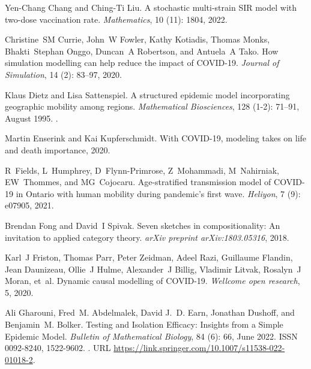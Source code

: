 \documentclass{article}
\theoremstyle{definition}
\begin{document}
\begin{thebibliography}{37}
Yen-Chang Chang and Ching-Ti Liu.
\newblock A stochastic multi-strain {SIR} model with two-dose vaccination rate.
\newblock \emph{Mathematics}, 10 (11): 1804, 2022.

Christine~SM Currie, John~W Fowler, Kathy Kotiadis, Thomas Monks,
  Bhakti~Stephan Onggo, Duncan~A Robertson, and Antuela~A Tako.
\newblock How simulation modelling can help reduce the impact of {COVID-19}.
\newblock \emph{Journal of Simulation}, 14 (2): 83--97, 2020.

Klaus Dietz and Lisa Sattenspiel.
\newblock A structured epidemic model incorporating geographic mobility among
  regions.
\newblock \emph{Mathematical Biosciences}, 128 (1-2): 71--91,
  August 1995.
\newblock {}.

Martin Enserink and Kai Kupferschmidt.
\newblock With {COVID-19}, modeling takes on life and death importance, 2020.

R~Fields, L~Humphrey, D~Flynn-Primrose, Z~Mohammadi, M~Nahirniak, EW~Thommes,
  and MG~Cojocaru.
\newblock Age-stratified transmission model of {COVID-19} in {Ontario} with
  human mobility during pandemic's first wave.
\newblock \emph{Heliyon}, 7 (9): e07905, 2021.

Brendan Fong and David~I Spivak.
\newblock Seven sketches in compositionality: An invitation to applied category
  theory.
\newblock \emph{arXiv preprint arXiv:1803.05316}, 2018.

Karl~J Friston, Thomas Parr, Peter Zeidman, Adeel Razi, Guillaume Flandin, Jean
  Daunizeau, Ollie~J Hulme, Alexander~J Billig, Vladimir Litvak, Rosalyn~J
  Moran, et~al.
\newblock Dynamic causal modelling of {COVID-19}.
\newblock \emph{Wellcome open research}, 5, 2020.

Ali Gharouni, Fred~M. Abdelmalek, David J.~D. Earn, Jonathan Dushoff, and
  Benjamin~M. Bolker.
\newblock Testing and {Isolation} {Efficacy}: {Insights} from a {Simple}
  {Epidemic} {Model}.
\newblock \emph{Bulletin of Mathematical Biology}, 84 (6):
  66, June 2022.
\newblock ISSN 0092-8240, 1522-9602.
\newblock {}.
\newblock URL \url{https://link.springer.com/10.1007/s11538-022-01018-2}.


\end{thebibliography}
\end{document}
